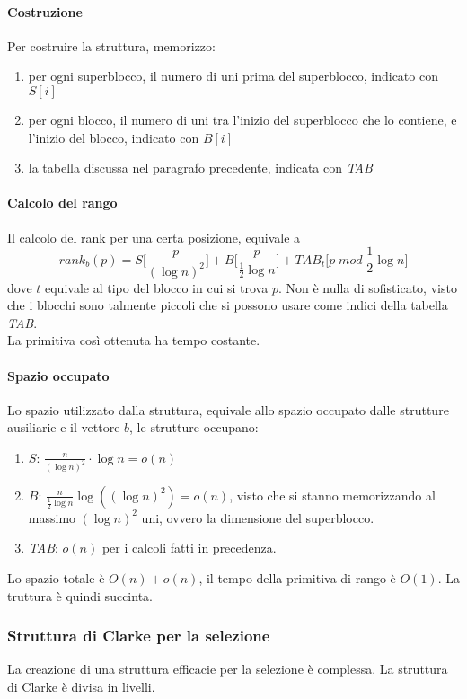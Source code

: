\paragraph{Costruzione}
Per costruire la struttura, memorizzo:
\begin{enumerate}
    \item per ogni superblocco, il numero di uni prima del superblocco,
    indicato con $S[i]$
    \item per ogni blocco, il numero di uni tra l'inizio del superblocco che lo contiene, 
    e l'inizio del blocco, indicato con $B[i]$
    \item la tabella discussa nel paragrafo precedente, indicata con \emph{TAB}
\end{enumerate}

\paragraph{Calcolo del rango}
Il calcolo del rank per una certa posizione, equivale a
$$\mathit{rank}_b(p) = S\bigg[\frac{p}{(\log n)^2}\bigg] + 
B\bigg[\frac{p}{\frac{1}{2}\log n}\bigg] + \mathit{TAB}_t\bigg[p \mathit{\;mod\;} 
\frac{1}{2}\log n\bigg]$$
dove $t$ equivale al tipo del blocco in cui si trova $p$.
Non è nulla di sofisticato, visto che i blocchi sono talmente piccoli che si
possono usare come indici della tabella \emph{TAB}.\\
La primitiva così ottenuta ha tempo costante.

\paragraph{Spazio occupato}
Lo spazio utilizzato dalla struttura, equivale allo spazio occupato dalle
strutture ausiliarie e il vettore $b$, le strutture occupano:
\begin{enumerate}
    \item $S$: $\frac{n}{(\log n)^2} \cdot \log n = o(n)$
    \item $B$: $\frac{n}{\frac{1}{2}\log n} \log ((\log n)^2) = o(n)$, visto che si stanno 
    memorizzando
    al massimo $(\log n)^2$ uni, ovvero la dimensione del superblocco.
    \item \emph{TAB}: $o(n)$ per i calcoli fatti in precedenza.
\end{enumerate}
Lo spazio totale è $O(n) + o(n)$, il tempo della primitiva di rango è $O(1)$. La truttura è 
quindi succinta.

\subsubsection{Struttura di Clarke per la selezione}
La creazione di una struttura efficacie per la selezione è complessa.
La struttura di Clarke è divisa in livelli.

